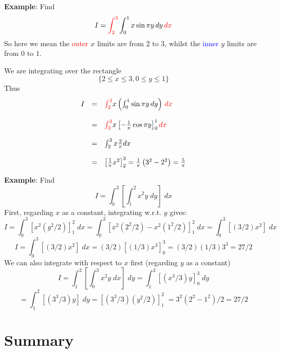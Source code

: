 \documentclass{article}
\begin{document}
\textbf{Example}: Find
$$ 
I=\textcolor{red}{\int_{2}^{3}}  \int_{0}^{1}  x \sin \pi y \, dy  \, \textcolor{red}{dx}
$$
So here we mean the \textcolor{red}{outer} $x$ limits are from $2$ to $3$, whilst the \textcolor{blue}{inner} $y$ limits are from $0$ to $1$.

We are integrating over the rectangle
$$
\lbrace 2 \leq x \leq 3, 0  \leq y \leq 1 \rbrace
$$
Thus
$$ 
\begin{array}{lll}
I & = & \textcolor{red}{\int_{2}^{3}} x \left( \int_{0}^{1} \sin \pi y \, dy  \right) \, \textcolor{red}{dx}\\
\\
& = & \textcolor{red}{\int_{2}^{3}} x \left[ - \frac{1}{\pi} \cos \pi y \right]_0^1 \textcolor{red}{dx} \\
\\
& = & \int_{2}^{3} x \frac{2}{\pi} dx \\
\\
& = & \left[ \frac{1}{\pi} x^2 \right]_2^3 = \frac{1}{\pi} \left( 3^2 - 2^2 \right) = \frac{5}{\pi} 
\end{array}
$$


\textbf{Example}: Find
$$ 
I= \int_{0}^{3} \left[  \int_{1}^{2} x^2  y \; dy \right] \; dx 
$$
First, regarding $x$ as a constant, integrating w.r.t. $y$ gives:
{\small
$$
I= \int_{0}^{3} \left[  x^2 (y^2/2)\right]_1^2 \; dx=\int_{0}^{3}
\left[  x^2 (2^2/2)- x^2 (1^2/2) \right]_1^2 \; dx= \int_{0}^{3}
\left[ (3/2) x^2 \right] \; dx
$$
$$
I=  \int_{0}^{3} \left[ (3/2) x^2 \right] \; dx= (3/2)\left[ (1/3)
x^3 \right]_0^3= (3/2)(1/3) 3^3=27/2
$$
}
We can also integrate with respect to $x$ first (regarding $y$ as a
constant)
$$
I= \int_{1}^{2} \left[  \int_{0}^{3} x^2  y \; dx \right] \; dy=
\int_{1}^{2} \left[  (x^3/3) y\right]_0^3 \; dy
$$
$$
=\int_{1}^{2}
\left[ (3^3/3)y \right] \; dy= \left[ (3^3/3) (y^2/2) \right]_1^2
\; = 3^2(2^2-1^2)/2=27/2
$$


\section*{Summary}
\end{document}
